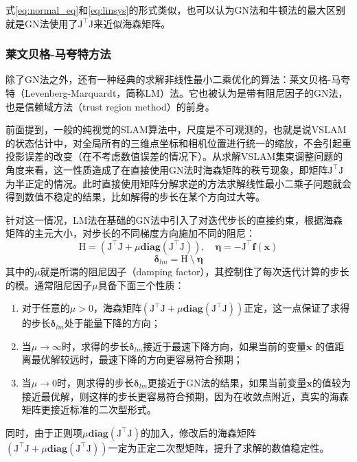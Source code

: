 式\eqref{eq:normal_eq}和\eqref{eq:linsys}的形式类似，也可以认为GN法和牛顿法的最大区别就是GN法使用了$\mathrm{J}^\top\mathrm{J}$来近似海森矩阵。

\subsubsection*{莱文贝格-马夸特方法}

除了GN法之外，还有一种经典的求解非线性最小二乘优化的算法：莱文贝格-马夸特（Levenberg-Marquardt，简称LM）法。它也被认为是带有阻尼因子的GN法，也是信赖域方法（trust region method）的前身\citep{jorge2006numerical}。

前面提到，一般的纯视觉的SLAM算法中，尺度是不可观测的，也就是说VSLAM的状态估计中，对全局所有的三维点坐标和相机位置进行统一的缩放，不会引起重投影误差的改变（在不考虑数值误差的情况下）。从求解VSLAM集束调整问题的角度来看，这一性质造成了在直接使用GN法时海森矩阵的秩亏现象，即矩阵$\mathrm{J}^\top\mathrm{J}$为半正定的情况。此时直接使用矩阵分解求逆的方法求解线性最小二乘子问题就会得到数值不稳定的结果，比如解得的步长在某个方向过大等。

针对这一情况，LM法在基础的GN法中引入了对迭代步长的直接约束，根据海森矩阵的主元大小，对步长的不同梯度方向施加不同的阻尼：
\begin{equation}
    \mathrm{H} = \left( \mathrm{J}^\top\mathrm{J}+\mu\mathbf{diag}(\mathrm{J}^\top\mathrm{J}) \right), \quad
    \bm{\eta}  = -\mathrm{J}^\top\bm{f}(\bm{x})
\end{equation}
\begin{equation}
    \bm{\delta}_{lm} = \mathrm{H} \:\setminus\: \bm{\eta}
    \label{eq:lm}
\end{equation}
其中的$\mu$就是所谓的阻尼因子（damping factor），其控制住了每次迭代计算的步长的模。通常阻尼因子$\mu$具备下面三个性质\citep{tingleff2004methods}：
\begin{enumerate}
    \item 对于任意的$\mu>0$，海森矩阵$(\mathrm{J}^\top\mathrm{J}+\mu\mathbf{diag}(\mathrm{J}^\top\mathrm{J}))$正定，这一点保证了求得的步长$\bm{\delta}_{lm}$处于能量下降的方向；
    \item 当$\mu\to\infty$时，求得的步长$\bm{\delta}_{lm}$接近于最速下降方向，如果当前的变量$\bm{x}$ 的值距离最优解较远时，最速下降的方向更容易符合预期；
    \item 当$\mu\to0$时，则求得的步长$\bm{\delta}_{lm}$更接近于GN法的结果，如果当前变量$\bm{x}$的值较为接近最优解，则这样的步长更容易符合预期，因为在收敛点附近，真实的海森矩阵更接近标准的二次型形式。
\end{enumerate}
同时，由于正则项$\mu\mathbf{diag}(\mathrm{J}^\top\mathrm{J})$的加入，修改后的海森矩阵$(\mathrm{J}^\top\mathrm{J}+\mu\mathbf{diag}(\mathrm{J}^\top\mathrm{J}))$一定为正定二次型矩阵，提升了求解的数值稳定性。

